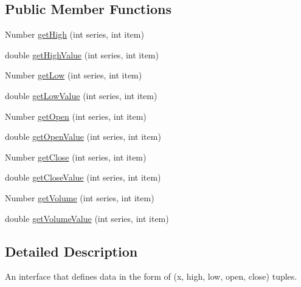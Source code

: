 \subsection*{Public Member Functions}
\begin{DoxyCompactItemize}
\item 
Number \mbox{\hyperlink{interfaceorg_1_1jfree_1_1data_1_1xy_1_1_o_h_l_c_dataset_a03f647b09b1a04ae0c2eb2bc5116d4d4}{get\+High}} (int series, int item)
\item 
double \mbox{\hyperlink{interfaceorg_1_1jfree_1_1data_1_1xy_1_1_o_h_l_c_dataset_acd02ab8db72bebf0234954bd962365cb}{get\+High\+Value}} (int series, int item)
\item 
Number \mbox{\hyperlink{interfaceorg_1_1jfree_1_1data_1_1xy_1_1_o_h_l_c_dataset_a87d7730829e66f23a2601c3519cf828a}{get\+Low}} (int series, int item)
\item 
double \mbox{\hyperlink{interfaceorg_1_1jfree_1_1data_1_1xy_1_1_o_h_l_c_dataset_a19a2a153a113ed4f82eedd596e94d1ed}{get\+Low\+Value}} (int series, int item)
\item 
Number \mbox{\hyperlink{interfaceorg_1_1jfree_1_1data_1_1xy_1_1_o_h_l_c_dataset_a652f2a7a04925cc72472d390217fef08}{get\+Open}} (int series, int item)
\item 
double \mbox{\hyperlink{interfaceorg_1_1jfree_1_1data_1_1xy_1_1_o_h_l_c_dataset_a20654fd4801bc8871dfe51bf65d62af6}{get\+Open\+Value}} (int series, int item)
\item 
Number \mbox{\hyperlink{interfaceorg_1_1jfree_1_1data_1_1xy_1_1_o_h_l_c_dataset_a7c84699d1c3f6d5b4d1378d7b23d49ac}{get\+Close}} (int series, int item)
\item 
double \mbox{\hyperlink{interfaceorg_1_1jfree_1_1data_1_1xy_1_1_o_h_l_c_dataset_a5533f5d89de4aec9d67cfdc9289a1099}{get\+Close\+Value}} (int series, int item)
\item 
Number \mbox{\hyperlink{interfaceorg_1_1jfree_1_1data_1_1xy_1_1_o_h_l_c_dataset_a05012f783f010c1a62873a0c40e7b7fa}{get\+Volume}} (int series, int item)
\item 
double \mbox{\hyperlink{interfaceorg_1_1jfree_1_1data_1_1xy_1_1_o_h_l_c_dataset_a132a37218de3b54bf308b3dcfb93cf84}{get\+Volume\+Value}} (int series, int item)
\end{DoxyCompactItemize}


\subsection{Detailed Description}
An interface that defines data in the form of (x, high, low, open, close) tuples. 

